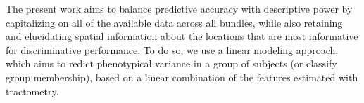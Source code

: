 \documentclass[10pt,%
               aps,%
               prl,%
               preprint,%
               superscriptaddress,%
               preprintnumbers,%
               amsmath,%
               floatfix,%
               endfloats*]{revtex4-1}
\begin{document}





The present work aims to balance predictive accuracy with descriptive power
\cite{Murdoch2019-ax, Breiman2001-uz} by capitalizing on all of the available
data across all bundles, while also retaining and elucidating spatial
information about the locations that are most informative for discriminative
performance. To do so, we use a linear modeling approach, which aims to
redict phenotypical variance in a group of subjects (or classify group
membership), based on a linear combination of the features estimated with
tractometry.

\end{document}
